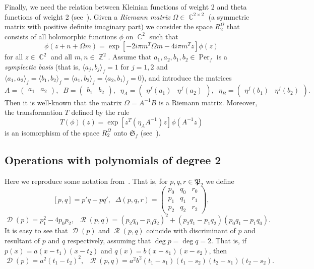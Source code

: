 \documentclass{amsart}
\numberwithin{equation}{section}
\theoremstyle{definition}
\theoremstyle{remark}
\DeclareMathOperator{\CC}{\mathbb C}
\DeclareMathOperator{\ZZ}{\mathbb Z}
\DeclareMathOperator{\Per}{Per}
\DeclareMathOperator{\Res}{\mathcal R}
\DeclareMathOperator{\Discr}{\mathcal D}
\begin{document}
	Finally, we need the relation between Kleinian functions of weight 2 and theta functions of weight 2 (see~\cite[Definition~II.1.2]{mumfordI}). Given a {\it{Riemann matrix}} $\Omega \in \CC^{2 \times 2}$ (a symmetric matrix with positive definite imaginary part) we consider the space $R_2^\Omega$ that consists of all holomorphic functions $\phi$ on $\CC^2$ such that 
	\[
	\phi(z + n + \Omega m) = \exp\left[-2i\pi m^T \Omega m -4i\pi m^T z\right]\phi(z)
	\]
	for all $z \in \CC^2$ and all $m,n \in \ZZ^2$. Assume that $a_1,a_2,b_1,b_2 \in \Per_f$ is a {\it{symplectic basis}} (that is, $\langle a_j, b_j\rangle_f = 1$ for $j = 1,2$ and $\langle a_1, a_2\rangle_f = \langle b_1, b_2\rangle_f = \langle a_1, b_2\rangle_f = \langle a_2, b_1\rangle_f = 0$), and introduce the matrices
	\[
	A = \begin{pmatrix}
		a_1 & a_2
	\end{pmatrix},\;\;
	B = \begin{pmatrix}
		b_1 & b_2
	\end{pmatrix},\;\;
	\eta_A = \begin{pmatrix}
		\eta^f(a_1) & \eta^f(a_2)
	\end{pmatrix},\;\;
	\eta_B = \begin{pmatrix}
		\eta^f(b_1) & \eta^f(b_2)
	\end{pmatrix}.
	\]
	Then it is well-known that the matrix $\Omega = A^{-1}B$ is a Riemann matrix. Moreover, the transformation $T$ defined by the rule
	\begin{equation}\label{eqTisomorphism}
		T(\phi)(z) = \exp\left[z^T (\eta_AA^{-1})z\right]\phi(A^{-1}z)
	\end{equation}
	is an isomorphism of the space $R^\Omega_2$ onto $\mathfrak S_f$ (see~\cite[Proposition~3.1]{KleinianWeight2}).
	
	\subsection{Operations with polynomials of degree 2}
	
	Here we reproduce some notation from~\cite{RichelotExpression}. That is, for $p,q,r \in \mathfrak P_2$ we define
	\[
	[p,q] = p'q - pq',\;\;\Delta(p,q,r) = \begin{pmatrix}
		p_0 & q_0 & r_0 \\
		p_1 & q_1 & r_1 \\
		p_2 & q_2 & r_2
	\end{pmatrix},
	\]
	\begin{equation*}\label{eqDiscrAndResDef}
		\Discr(p) = p_1^2 - 4p_0 p_2,\;\; \Res(p,q) = (p_2 q_0 - p_0 q_2)^2 + (p_2 q_1 - p_1 q_2)(p_0 q_1 - p_1 q_0).
	\end{equation*}
	It is easy to see that $\Discr(p)$ and $\Res(p,q)$ coincide with discriminant of $p$ and resultant of $p$ and $q$ respectively, assuming that $\deg p = \deg q = 2$. That is, if $p(x) = a(x - t_1)(x - t_2)$ and $q(x) = b(x - s_1)(x - s_2)$, then  \begin{equation}\label{eqDiscrAndResRootFormula}
		\Discr(p) = a^2(t_1 - t_2)^2,\;\;\Res(p,q) = a^2b^2(t_1 - s_1)(t_1 - s_2)(t_2 - s_1)(t_2 - s_2).
	\end{equation}
	
\end{document}
